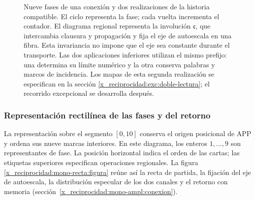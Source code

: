 \begin{figure}[p]
\caption{Nueve fases de una conexión y dos realizaciones de la historia
compatible. El ciclo representa la fase; cada vuelta incrementa el contador.
El diagrama regional representa la involución \(\mathfrak c\), que
intercambia clausura y propagación y fija el eje de autoescala en una fibra.
Esta invariancia no impone que el eje sea constante durante el transporte.
Las dos aplicaciones inferiores utilizan el mismo prefijo: una determina
su límite numérico y la otra conserva palabras y marcos de incidencia. Los
mapas de esta segunda realización se especifican en la sección
\ref{x_reciprocidad:exc:doble-lectura}; el recorrido excepcional se desarrolla después.}
\label{x_reciprocidad:mono-ampl:fig-regional}
\end{figure}




\clearpage
\subsubsection{Representación rectilínea de las fases y del retorno}
\label{x_reciprocidad:mono-recta:desarrollo}

La representación sobre el segmento \([0,10]\) conserva el origen
posicional de APP y ordena sus nueve marcas interiores. En este diagrama,
los enteros \(1,\ldots,9\) son representantes de fase. La posición
horizontal indica el orden de las cartas; las etiquetas superiores
especifican operaciones regionales. La figura
\ref{x_reciprocidad:mono-recta:figura} reúne así la recta de partida, la fijación del
eje de autoescala, la distribución especular de los dos canales y el
retorno con memoria (sección~\ref{x_reciprocidad:mono-ampl:conexion}).


